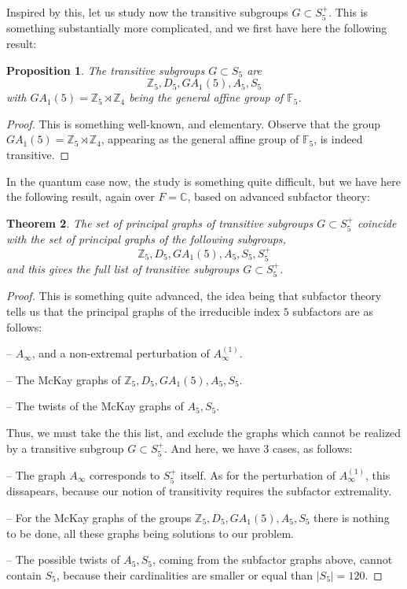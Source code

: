 \documentclass[12pt]{amsbook}
\newtheorem{theorem}{Theorem}[chapter]
\newtheorem{proposition}[theorem]{Proposition}
\begin{document}
Inspired by this, let us study now the transitive subgroups $G\subset S_5^+$. This is something substantially more complicated, and we first have here the following result:

\begin{proposition}
The transitive subgroups $G\subset S_5$ are
$$\mathbb Z_5,D_5,GA_1(5),A_5,S_5$$
with $GA_1(5)=\mathbb Z_5\rtimes\mathbb Z_4$ being the general affine group of $\mathbb F_5$.
\end{proposition}

\begin{proof}
This is something well-known, and elementary. Observe that the group $GA_1(5)=\mathbb Z_5\rtimes\mathbb Z_4$, appearing as the general affine group of $\mathbb F_5$, is indeed transitive.
\end{proof}

In the quantum case now, the study is something quite difficult, but we have here the following result, again over $F=\mathbb C$, based on advanced subfactor theory:

\begin{theorem}
The set of principal graphs of transitive subgroups $G\subset S_5^+$ coincide with the set of principal graphs of the following subgroups,
$$\mathbb Z_5,D_5,GA_1(5),A_5,S_5,S_5^+$$
and this gives the full list of transitive subgroups $G\subset S_5^+$.
\end{theorem}

\begin{proof}
This is something quite advanced, the idea being that subfactor theory tells us that the principal graphs of the irreducible index $5$ subfactors are as follows:

\medskip

-- $A_\infty$, and a non-extremal perturbation of $A_\infty^{(1)}$.

\medskip

-- The McKay graphs of $\mathbb Z_5,D_5,GA_1(5),A_5,S_5$.

\medskip

-- The twists of the McKay graphs of $A_5,S_5$.

\medskip

Thus, we must take the this list, and exclude the graphs which cannot be realized by a transitive subgroup $G\subset S_5^+$. And here, we have 3 cases, as follows:

\medskip

-- The graph $A_\infty$ corresponds to $S_5^+$ itself. As for the perturbation of $A_\infty^{(1)}$, this dissapears, because our notion of transitivity requires the subfactor extremality.

\medskip

-- For the McKay graphs of the groups $\mathbb Z_5,D_5,GA_1(5),A_5,S_5$ there is nothing to be done, all these graphs being solutions to our problem.

\medskip

-- The possible twists of $A_5,S_5$, coming from the subfactor graphs above, cannot contain $S_5$, because their cardinalities are smaller or equal than $|S_5|=120$.
\end{proof}
\end{document}
